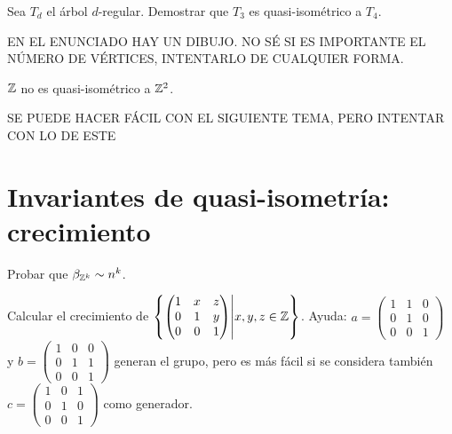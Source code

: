 \documentclass[twoside]{article}
\begin{document}
\newpage

\begin{ejercicio}{1.4}
Sea $T_d$ el árbol $d$-regular. Demostrar que $T_3$ es quasi-isométrico a $T_4$.
\end{ejercicio}
\begin{solucion}
EN EL ENUNCIADO HAY UN DIBUJO. NO SÉ SI ES IMPORTANTE EL NÚMERO DE VÉRTICES, INTENTARLO DE CUALQUIER FORMA. 
\end{solucion}

\newpage

\begin{ejercicio}{1.5}
$\mathbb{Z}$ no es quasi-isométrico a $\mathbb{Z}^2$.
\end{ejercicio}
\begin{solucion}
SE PUEDE HACER FÁCIL CON EL SIGUIENTE TEMA, PERO INTENTAR CON LO DE ESTE
\end{solucion}

\newpage

\section{Invariantes de quasi-isometría: crecimiento}

\begin{ejercicio}{2.1}
Probar que $\beta_{\mathbb{Z}^k}\sim n^k$.
\end{ejercicio}
\begin{solucion}

\end{solucion}

\newpage

\begin{ejercicio}{2.2}
Calcular el crecimiento de $\left\{\begin{pmatrix}
1 & x & z\\
0 & 1 & y\\
0 & 0 & 1
\end{pmatrix}\middle\vert x,y,z\in\mathbb{Z}\right\}$. Ayuda: $a=\begin{pmatrix}
1 & 1 & 0\\
0 & 1 & 0\\
0 & 0 & 1
\end{pmatrix}$ y $b=\begin{pmatrix}
1 & 0 & 0\\
0 & 1 & 1\\
0 & 0 & 1
\end{pmatrix}$ generan el grupo, pero es más fácil si se considera también $c=\begin{pmatrix}
1 & 0 & 1\\
0 & 1 & 0\\
0 & 0 & 1
\end{pmatrix}$ como generador. 
\end{ejercicio}
\begin{solucion}

\end{solucion}
\end{document}
